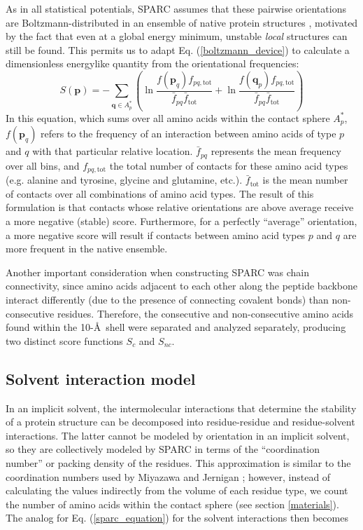 \documentclass[11pt,titlepage]{article}
\begin{document}
As in all statistical potentials, SPARC assumes that these pairwise orientations are Boltzmann-distributed in an ensemble of native protein structures \cite{sippl}, motivated by the fact that even at a global energy minimum, unstable \textit{local} structures can still be found.
This permits us to adapt Eq. (\ref{boltzmann_device}) to calculate a dimensionless energylike quantity from the orientational frequencies:
\begin{equation}
\displaystyle
S(\textbf{p}) = -\sum_{\textbf{q}\in A_p^*} \left(\ln{\frac{f(\textbf{p}_q)f_{pq,\text{tot}}}{\bar{f}_{pq}\bar{f}_\text{tot}}} + \ln{\frac{f(\textbf{q}_p)f_{pq,\text{tot}}}{\bar{f}_{pq}\bar{f}_\text{tot}}}\right)
\label{sparc_equation}
\end{equation}
In this equation, which sums over all amino acids within the contact sphere $A_p^*$, $f(\textbf{p}_q)$ refers to the frequency of an interaction between amino acids of type $p$ and $q$ with that particular relative location. 
$\bar{f}_{pq}$ represents the mean frequency over all bins, and $f_{pq,\text{tot}}$ the total number of contacts for these amino acid types (e.g. alanine and tyrosine, glycine and glutamine, etc.).
$\bar{f}_\text{tot}$ is the mean number of contacts over all combinations of amino acid types.
The result of this formulation is that contacts whose relative orientations are above average receive a more negative (stable) score.
Furthermore, for a perfectly ``average'' orientation, a more negative score will result if contacts between amino acid types $p$ and $q$ are more frequent in the native ensemble.

Another important consideration when constructing SPARC was chain connectivity, since amino acids adjacent to each other along the peptide backbone interact differently (due to the presence of connecting covalent bonds) than non-consecutive residues.
Therefore, the consecutive and non-consecutive amino acids found within the 10-\AA\, shell were separated and analyzed separately, producing two distinct score functions $S_c$ and $S_{nc}$.

\subsection{Solvent interaction model}
In an implicit solvent, the intermolecular interactions that determine the stability of a protein structure can be decomposed into residue-residue and residue-solvent interactions.
The latter cannot be modeled by orientation in an implicit solvent, so they are collectively modeled by SPARC in terms of the ``coordination number'' or packing density of the residues.
This approximation is similar to the coordination numbers used by Miyazawa and Jernigan \cite{miyazawa}; however, instead of calculating the values indirectly from the volume of each residue type, we count the number of amino acids within the contact sphere (see section \ref{materials}).
The analog for Eq. (\ref{sparc_equation}) for the solvent interactions then becomes
\end{document}

